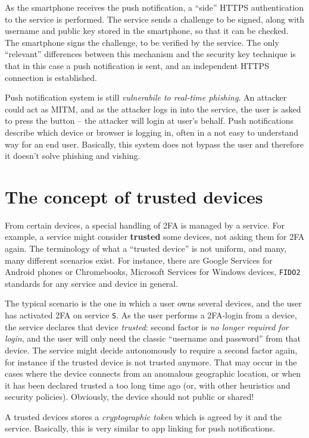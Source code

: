 \documentclass[10pt]{extbook}
\begin{document}
As the smartphone receives the push notification, a ``side'' HTTPS
authentication to the service is performed. The service sends a challenge to be
signed, along with username and public key stored in the smartphone, so that it
can be checked. The smartphone signs the challenge, to be verified by the
service. The only ``relevant'' differences between this mechanism and the
security key technique is that in this case a push notification is sent, and an
independent HTTPS connection is established.

Push notification system is still \emph{vulnerabile to real\--time phishing}.
An attacker could act as MITM, and as the attacker logs in into the service,
the user is asked to press the button -- the attacker will login at user's
behalf. Push notifications describe which device or browser is logging in,
often in a not easy to understand way for an end user. Basically, this system
does not bypass the user and therefore it doesn't solve phishing and vishing.

\section{The concept of trusted devices}

From certain devices, a special handling of 2FA is managed by a service. For
example, a service might consider \textbf{trusted} some devices, not asking
them for 2FA again. The terminology of what a ``trusted device'' is not
uniform, and many, many different scenarios exist. For instance, there are
Google Services for Android phones or Chromebooks, Microsoft Services for
Windows devices, \texttt{FIDO2} standards for any service and device in
general.

The typical scenario is the one in which a user owns several devices, and the
user has activated 2FA on service \texttt{S}. As the user performs a
2FA\--login from a device, the service declares that device \emph{trusted}:
second factor is \emph{no longer required for login}, and the user will only
need the classic ``username and password'' from that device. The service might
decide autonomously to require a second factor again, for instance if the
trusted device is not trusted anymore. That may occur in the cases where the
device connects from an anomalous geographic location, or when it has been
declared trusted a too long time ago (or, with other heuristics and security
policies). Obviously, the device should not public or shared!

A trusted devices stores a \emph{cryptographic token} which is agreed by it and
the service. Basically, this is very similar to app linking for push
notifications.
\end{document}
